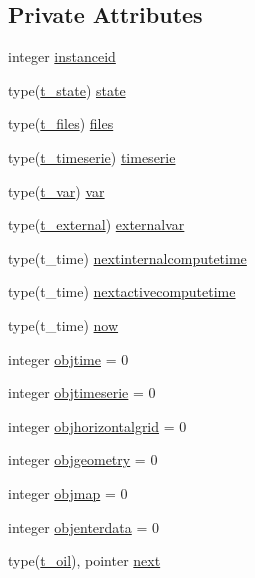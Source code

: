 \subsection*{Private Attributes}
\begin{DoxyCompactItemize}
\item 
integer \mbox{\hyperlink{structmoduleoil_1_1t__oil_ac83fd6a06ca7a54d892855d0f00b4337}{instanceid}}
\item 
type(\mbox{\hyperlink{structmoduleoil_1_1t__state}{t\+\_\+state}}) \mbox{\hyperlink{structmoduleoil_1_1t__oil_ae4aec8edbf097a7ff78b71c262d2bd93}{state}}
\item 
type(\mbox{\hyperlink{structmoduleoil_1_1t__files}{t\+\_\+files}}) \mbox{\hyperlink{structmoduleoil_1_1t__oil_a652831350b2cd7e4aa7463a46a95e0fd}{files}}
\item 
type(\mbox{\hyperlink{structmoduleoil_1_1t__timeserie}{t\+\_\+timeserie}}) \mbox{\hyperlink{structmoduleoil_1_1t__oil_a70b5ae27f325ea8640e5e7884e059b14}{timeserie}}
\item 
type(\mbox{\hyperlink{structmoduleoil_1_1t__var}{t\+\_\+var}}) \mbox{\hyperlink{structmoduleoil_1_1t__oil_adbc3fbee7764cbd713e01c02fd831351}{var}}
\item 
type(\mbox{\hyperlink{structmoduleoil_1_1t__external}{t\+\_\+external}}) \mbox{\hyperlink{structmoduleoil_1_1t__oil_ac0941ca64d1b30acfaf9dcb8817cab8d}{externalvar}}
\item 
type(t\+\_\+time) \mbox{\hyperlink{structmoduleoil_1_1t__oil_aa0bfdf1228b128b06d430d8989e22599}{nextinternalcomputetime}}
\item 
type(t\+\_\+time) \mbox{\hyperlink{structmoduleoil_1_1t__oil_a8b2136f0f1b063bb512e361aeda33c26}{nextactivecomputetime}}
\item 
type(t\+\_\+time) \mbox{\hyperlink{structmoduleoil_1_1t__oil_a87468ca14d185c39a6b7b66e8fbc2c6e}{now}}
\item 
integer \mbox{\hyperlink{structmoduleoil_1_1t__oil_a4104209268300df2e91adbfc0693f539}{objtime}} = 0
\item 
integer \mbox{\hyperlink{structmoduleoil_1_1t__oil_a4c265ecd9061d38e5120a8fc63a0075f}{objtimeserie}} = 0
\item 
integer \mbox{\hyperlink{structmoduleoil_1_1t__oil_ad4eb8d2731fba74d5788e0cf4a6cb8e4}{objhorizontalgrid}} = 0
\item 
integer \mbox{\hyperlink{structmoduleoil_1_1t__oil_aecbbe9b9674a76424c853b760dd4f8e8}{objgeometry}} = 0
\item 
integer \mbox{\hyperlink{structmoduleoil_1_1t__oil_a733bd01be0d0979a64f19ff522091d68}{objmap}} = 0
\item 
integer \mbox{\hyperlink{structmoduleoil_1_1t__oil_af38c1151a361b8e91f7002f83e504f62}{objenterdata}} = 0
\item 
type(\mbox{\hyperlink{structmoduleoil_1_1t__oil}{t\+\_\+oil}}), pointer \mbox{\hyperlink{structmoduleoil_1_1t__oil_aaf5d423639928232d092b8feb4f570d7}{next}}
\end{DoxyCompactItemize}



